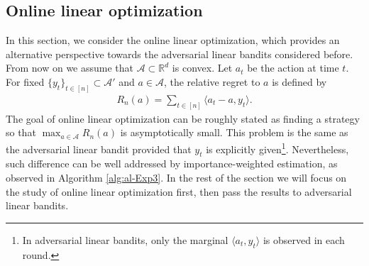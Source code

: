 \documentclass[10pt,a4article]{article}
\numberwithin{equation}{section}
\theoremstyle{plain}
\theoremstyle{definition}
\def\R{{\mathbb R}}
\def\R{{\mathbb R}}
\begin{document}
\subsection{Online linear optimization}

In this section, we consider the online linear optimization, which provides an alternative perspective towards the adversarial linear bandits considered before. 
From now on we assume that $\mathcal A\subset\R^d$ is convex. 
Let $a_t$ be the action at time $t$. For fixed $\{y_t\}_{t\in [n]}\subset \mathcal A'$ and $a\in\mathcal A$, the relative regret to $a$ is defined by 
\begin{align*}
R_n(a) = \sum_{t\in [n]}\langle a_t-a, y_t\rangle. 
\end{align*}
The goal of online linear optimization can be roughly stated as finding a strategy so that $\max_{a\in\mathcal A}R_n(a)$ is asymptotically small. This problem is the same as the adversarial linear bandit provided that $y_t$ is explicitly given\footnote{In adversarial linear bandits, only the marginal $\langle a_t, y_t\rangle$ is observed in each round.}. 
Nevertheless, such difference can be well addressed by importance-weighted estimation, as observed in Algorithm \ref{alg:al-Exp3}. 
In the rest of the section we will focus on the study of online linear optimization first, then pass the results to adversarial linear bandits. 
\end{document}
